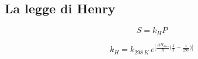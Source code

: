 \subsection{La legge di Henry}

$$S=k_HP$$

$$k_H=k_{298 \, K} \, e^{\big[\frac{\Delta H_{diss}}{R} \big( \frac{1}{T} - \frac{1}{298} \big) \big]}$$